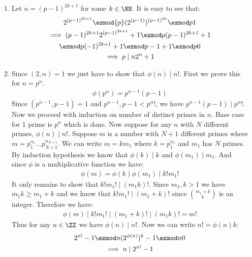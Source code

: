 \begin{enumerate}[label=\ilabel]
    \item
        Let $n = (p - 1)^{2k + 1}$ for some $k \in \NN$. It is easy to see that:
        \begin{gather*}
            2^{(p - 1)^{2k + 1}} \ezmod{p} (2^{(p - 1)})^{(p - 1)^{2k}} \ezmod p 1 \\
            \implies (p - 1)^{2k + 1} 2^{(p - 1)^{2k + 1}} + 1 \ezmod p (p - 1)^{2k + 1} + 1 \\
            \ezmod p (-1)^{2k + 1} + 1 \ezmod p -1 + 1 \ezmod p 0 \\
            \implies p \mid n2^n + 1
        \end{gather*}
    \item 
        Since $(2, n) = 1$ we just have to show that $\phi(n) \mid n!$.
        First we prove this for $n = p^\alpha$.
        \begin{gather*}
            \phi(p^\alpha) = p^{\alpha - 1} (p - 1)
        \end{gather*}
        Since $(p^{\alpha - 1}, p - 1) = 1$ and $p^{\alpha - 1}, p - 1 < p^\alpha !$, we have $p^{\alpha - 1} (p - 1) \mid p^\alpha !$.
        Now we proceed with induction on number of distinct primes in $n$.
        Base case for 1 prime is $p^\alpha$ which is done.
        Now suppose for any $n$ with $N$ different primes, $\phi(n) \mid n!$.
        Suppose $m$ is a number with $N + 1$ different primes where $m = p_1^{\alpha_1} \dots p_{N + 1}^{\alpha_{N + 1}}$. We can write $m = k m_1$ where $k = p_1^{\alpha_1}$ and $m_1$ has $N$ primes. By induction hypothesis we know that $\phi(k) \mid k$ and $\phi(m_1) \mid m_1$. And since $\phi$ is a multiplicative function we have:
        \begin{gather*}
            \phi(m) = \phi(k) \phi(m_1) \mid k! m_1!
        \end{gather*}
        It only remains to show that $k! m_1! \mid (m_1k)!$. Since $m_1, k > 1$ we have $m_1k \ge m_1 + k$ and we know that $k!m_1! \mid (m_1 + k)!$ since ${m_1 + k \choose k}$ is an integer. Therefore we have:
        \begin{gather*}
            \phi(m) \mid k!m_1! \mid (m_1 + k)! \mid (m_1k)! = m!
        \end{gather*}
        Thus for any $n \in \ZZ$ we have $\phi(n) \mid n!$. Now we can write $n! = \phi(n) k$:
        \begin{gather*}
            2^{n!} - 1 \ezmod n (2^{\phi(n)})^k - 1 \ezmod n 0\\
            \implies n \mid 2^{n!} - 1
        \end{gather*}
\end{enumerate}